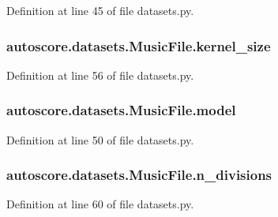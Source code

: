 Definition at line 45 of file datasets.\+py.

\subsubsection[{\texorpdfstring{kernel\+\_\+size}{kernel_size}}]{\setlength{\rightskip}{0pt plus 5cm}autoscore.\+datasets.\+Music\+File.\+kernel\+\_\+size}\hypertarget{classautoscore_1_1datasets_1_1MusicFile_aa0c2d8221dbf487cbe40366174c4c4de}{}\label{classautoscore_1_1datasets_1_1MusicFile_aa0c2d8221dbf487cbe40366174c4c4de}


Definition at line 56 of file datasets.\+py.

\subsubsection[{\texorpdfstring{model}{model}}]{\setlength{\rightskip}{0pt plus 5cm}autoscore.\+datasets.\+Music\+File.\+model}\hypertarget{classautoscore_1_1datasets_1_1MusicFile_a5ff57ae711407456d3d211797d3c8eb1}{}\label{classautoscore_1_1datasets_1_1MusicFile_a5ff57ae711407456d3d211797d3c8eb1}


Definition at line 50 of file datasets.\+py.

\subsubsection[{\texorpdfstring{n\+\_\+divisions}{n_divisions}}]{\setlength{\rightskip}{0pt plus 5cm}autoscore.\+datasets.\+Music\+File.\+n\+\_\+divisions}\hypertarget{classautoscore_1_1datasets_1_1MusicFile_a2554f38bd0d96e22e6328049b4f97d76}{}\label{classautoscore_1_1datasets_1_1MusicFile_a2554f38bd0d96e22e6328049b4f97d76}


Definition at line 60 of file datasets.\+py.

